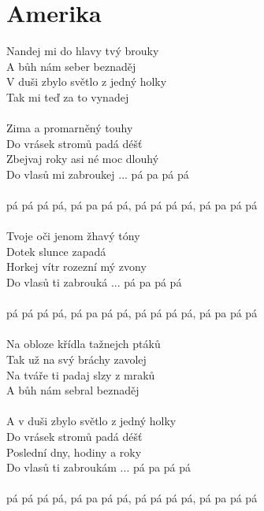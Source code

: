 \section{Amerika}
Nandej mi do hlavy tvý brouky\\
A bůh nám seber beznaděj\\
V duši zbylo světlo z jedný holky\\
Tak mi teď za to vynadej\\
\\
Zima a promarněný touhy\\
Do vrásek stromů padá déšť\\
Zbejvaj roky asi né moc dlouhý\\
Do vlasů mi zabroukej ... pá pa pá pá\\
\\
pá pá pá pá, pá pa pá pá, pá pá pá pá, pá pa pá pá\\
\\
Tvoje oči jenom žhavý tóny\\
Dotek slunce zapadá\\
Horkej vítr rozezní mý zvony\\
Do vlasů ti zabrouká ... pá pa pá pá\\
\\
pá pá pá pá, pá pa pá pá, pá pá pá pá, pá pa pá pá\\
\\
Na obloze křídla tažnejch ptáků\\
Tak už na svý bráchy zavolej\\
Na tváře ti padaj slzy z mraků\\
A bůh nám sebral beznaděj\\
\\
A v duši zbylo světlo z jedný holky\\
Do vrásek stromů padá déšť\\
Poslední dny, hodiny a roky\\
Do vlasů ti zabroukám ... pá pa pá pá\\
\\
pá pá pá pá, pá pa pá pá, pá pá pá pá, pá pa pá pá\\